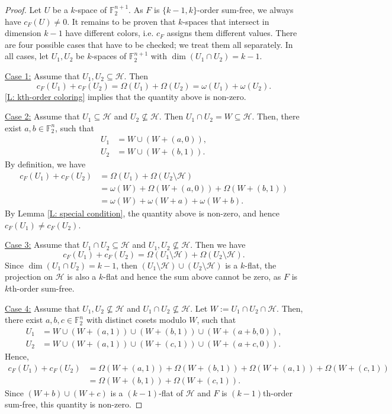 \documentclass[12pt]{article}
\theoremstyle{definition}
\newcommand{\HH}{\mathcal{H}}
\newcommand{\F}{\mathbb F}
\begin{document}
\begin{proof}
Let $U$ be a $k$-space of $\F_2^{n+1}$. As $F$ is $\{k-1,k\}$-order sum-free, we always have  $c_F(U)\ne0$.
   It remains to be proven that $k$-spaces that intersect in dimension $k-1$ have different colors, i.e. $c_F$ assigns them different values.
There are four possible cases that have to be checked; we treat them all separately. In all cases, let $U_1,U_2$ be $k$-spaces of $\F_2^{n+1}$ with $\dim(U_1\cap U_2)=k-1$.

    \noindent \underline{Case 1:} Assume that $U_1,U_2\subseteq \HH$. Then 
    $$
    c_F(U_1) + c_F(U_2) = \Omega(U_1) + \Omega(U_2) =\omega(U_1) + \omega(U_2).
    $$
 \cref{L: kth-order coloring} implies that the quantity above is non-zero.
  

    \noindent \underline{Case 2:}  Assume that $U_1\subseteq \HH$  and  $U_2\not \subseteq \HH$. Then $U_1 \cap U_2 = W \subseteq \mathcal{H}$. 
    Then, there exist  $a,b\in \F_2^n$, such that 
    \begin{align*}
         U_1 &= W \cup (W + (a, 0)), \\
         U_2 &= W \cup (W+(b, 1)).
     \end{align*}
    By definition, we have 
    \begin{align*}
         c_F(U_1) + c_F(U_2)  &=\Omega(U_1) + \Omega(U_2\setminus \HH) \\
      &= \omega(W) + \Omega(W +(a, 0)) + \Omega(W +(b,1))\\
      &= \omega(W) + \omega(W +a) + \omega(W +b).
     \end{align*}
By Lemma \ref{L: special condition}, the quantity above is non-zero, and hence $c_F(U_1) \neq c_F(U_2)$.
    

     \noindent \underline{Case 3:} Assume that $U_1\cap U_2\subseteq \HH$ and $U_1,U_2\not\subseteq \HH$. Then we have
     $$
     c_F(U_1) +c_F(U_2) = \Omega(U_1\setminus \HH) + \Omega(U_2 \setminus \HH).
     $$
     Since $\dim(U_1 \cap U_2) = k-1$, then $(U_1 \setminus \HH) \cup (U_2\setminus \HH)$ is a $k$-flat, the projection on $\HH$ is also a $k$-flat and hence the sum above cannot be zero, as $F$ is $k$th-order sum-free. 

     \noindent \underline{Case 4:} Assume that $U_1,U_2\not\subseteq \HH$ and $U_1\cap U_2\not\subseteq \HH$. Let $W:= U_1 \cap U_2 \cap \HH$. Then, there exist  $a, b, c \in \F_2^n$ with distinct cosets modulo $W$, such that
     \begin{align*}
         U_1 &= W \cup (W + (a, 1)) \cup (W+ (b, 1)) \cup (W + (a+b, 0)), \\
         U_2 &= W \cup (W+(a, 1)) \cup (W + (c, 1)) \cup (W+ (a+c, 0)).
     \end{align*}
     Hence, 
     \begin{align*}
     c_F(U_1) + c_F(U_2)& = \Omega(W + (a, 1)) + \Omega(W + (b, 1)) + \Omega(W + (a, 1)) + \Omega(W + (c, 1)) \\
     &= \Omega(W + (b, 1)) + \Omega(W + (c, 1)).
     \end{align*}
     Since $(W + b)\cup (W + c)$ is a $(k-1)$-flat of $\HH$ and $F$ is $(k-1)$th-order sum-free, this quantity is non-zero.
 \end{proof}
\end{document}

